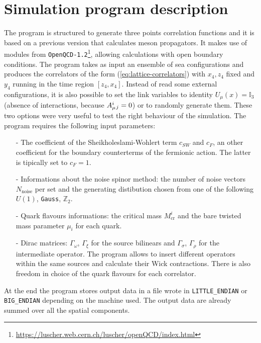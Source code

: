 \documentclass[english, LaM, oneside, noexaminfo]{sapthesis}
\begin{document}
\section{Simulation program description}\label{sec:program}
\noindent
The program is structured to generate three points correlation functions and it is based on a previous version that calculates meson propagators.
It makes use of modules from \texttt{OpenQCD-1.2}\footnote{\href{https://luscher.web.cern.ch/luscher/openQCD/index.html}{https://luscher.web.cern.ch/luscher/openQCD/index.html}}, allowing calculations with open boundary conditions.
The program takes as input an ensemble of sea configurations and produces the correlators of the form (\ref{eq:lattice-correlators}) with $x_4, z_4$ fixed and $y_4$ running in the time region $[z_4,x_4]$.
Instead of read some external configurations, it is also possible to set the link variables to identity $U_\mu(x) = \mathbb{I}_3$ (absence of interactions, because $A_\mu^{i} \hspace*{.1mm}_j = 0$) or to randomly generate them.
These two options were very useful to test the right behaviour of the simulation.
The program requires the following input parameters:
\begin{itemize}
    \item [-] The coefficient of the Sheikholeslami-Wohlert term $c_{SW}$ and $c_F$, an other coefficient for the boundary counterterms of the fermionic action.
                The latter is tipically set to $c_F = 1$.
    \item [-] Informations about the noise spinor method: the number of noise vectors $N_\text{noise}$ per set and the generating distibution chosen from one of the following $U(1)$, \texttt{Gauss}, $\mathbb{Z}_2$.
    \item [-] Quark flavours informations: the critical mass $M^i_\text{cr}$ and the bare twisted mass parameter $\mu_i$ for each quark.
    \item [-] Dirac matrices: $\Gamma_\omega$, $\Gamma_\xi$ for the source bilinears and $\Gamma_\sigma$, $\Gamma_\rho$ for the intermediate operator.
        The program allows to insert different operators within the same sources and calculate their Wick contractions.
        There is also freedom in choice of the quark flavours for each correlator.
\end{itemize}
At the end the program stores output data in a file wrote in \texttt{LITTLE\_ENDIAN} or \texttt{BIG\_ENDIAN} depending on the machine used.
The output data are already summed over all the spatial components.
\end{document}
